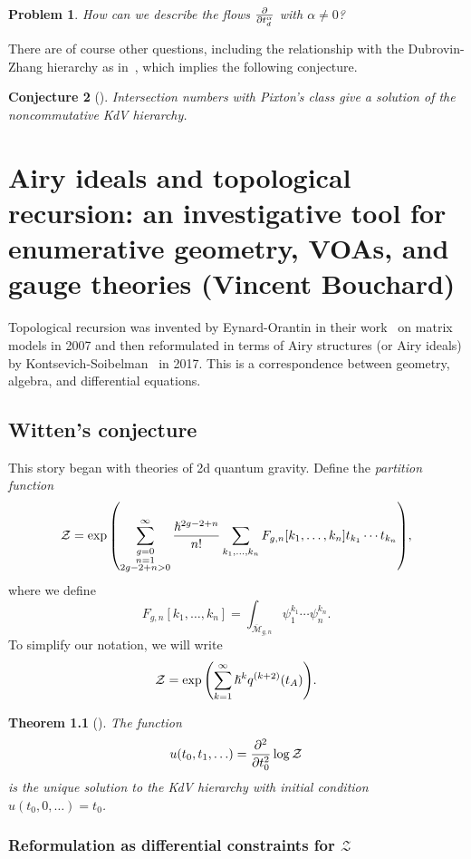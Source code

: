 \documentclass[leqno, openany]{memoir}
\newtheorem{thm}{Theorem}[section]
\newtheorem{conj}[thm]{Conjecture}
\newtheorem{prob}[thm]{Problem}
\theoremstyle{definition}
\theoremstyle{remark}
\theoremstyle{plain}
\theoremstyle{definition}
\theoremstyle{remark}
\newcommand{\mc}[1]{\mathcal{#1}}
\newcommand{\ol}[1]{\overline{#1}}
\begin{document}
\begin{prob}
    How can we describe the flows $\pdv{t_d^{\alpha}}$ with $\alpha \neq 0$?
\end{prob}

There are of course other questions, including the relationship with the Dubrovin-Zhang hierarchy as in~, which implies the following conjecture.
\begin{conj}[\cite{nckdvpixton}]
    Intersection numbers with Pixton's class give a solution of the noncommutative KdV hierarchy.
\end{conj}

\chapter{Airy ideals and topological recursion: an investigative tool for enumerative geometry, VOAs, and gauge theories (Vincent Bouchard)}%

Topological recursion was invented by Eynard-Orantin in their work~\cite{toprecursion} on matrix models in 2007 and then reformulated in terms of Airy structures (or Airy ideals) by Kontsevich-Soibelman~\cite{airytoprec} in 2017. This is a correspondence between geometry, algebra, and differential equations.

\section{Witten's conjecture}

This story began with theories of 2d quantum gravity.
Define the \textit{partition function}
\[ \mc{Z} = \exp \qty(\sum_{\substack{g=0 \\ n=1 \\ 2g-2+n>0}}^{\infty} \frac{\hslash^{2g-2+n}}{n!} \sum_{k_1, \ldots, k_n} F_{g,n}[k_1, \ldots, k_n] t_{k_1} \cdots t_{k_n}), \]
where we define
\[ F_{g,n}[k_1, \ldots, k_n] = \int_{\ol{\mc{M}}_{g,n}} \psi_1^{k_1} \cdots \psi_n^{k_n}. \]
To simplify our notation, we will write
\[ \mc{Z} = \exp \qty(\sum_{k=1}^{\infty} \hslash^k q^{(k+2)}(t_A)). \]

\begin{thm}[\cite{wittenconj}]\label{thm:witten}
    The function
    \[ u(t_0, t_1, \ldots) = \pdv[2]{t_0} \log \mc{Z} \]
    is the unique solution to the KdV hierarchy with initial condition $u(t_0, 0, \ldots) = t_0$.
\end{thm}

\subsection{Reformulation as differential constraints for $\mc{Z}$}
\end{document}

